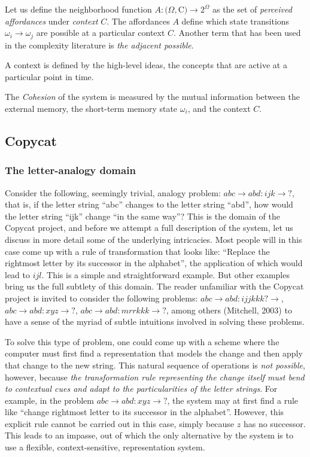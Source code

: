 Let us define the neighborhood function $A:(\Omega,$C$) \to 2^\Omega$ as the set of \emph{perceived affordances} under \emph{context} $C$.  The affordances $A$ define which state transitions $\omega_i \to \omega_j$ are possible at a particular context $C$. Another term that has been used in the complexity literature is \emph{the adjacent possible}. 

A context is defined by the high-level ideas, the concepts that are active at a particular point in time. 

The \emph{Cohesion} of the system is measured by the mutual information between the external memory, the short-term memory state $\omega_i$, and the context $C$.  

\subsection{Copycat}


\subsubsection{The letter-analogy domain}

Consider the following, seemingly trivial, analogy problem: $abc \to abd:ijk \to ?$, that is, if the letter string “abc” changes to the letter string “abd”, how would the letter string “ijk” change “in the same way”?  This is the domain of the Copycat project, and before we attempt a full description of the system, let us discuss in more detail some of the underlying intricacies.   Most people will in this case come up with a rule of transformation that looks like: “Replace the rightmost letter by its successor in the alphabet”, the application of which would lead to $ijl$.  This is a simple and straightforward example.  But other examples bring us the full subtlety of this domain.  The reader unfamiliar with the Copycat project is invited to consider the following problems: $abc\to abd: ijjkkk?\to $, $abc\to abd: xyz\to ?$, $abc\to abd: mrrkkk\to ?$, among others (Mitchell, 2003) to have a sense of the myriad of subtle intuitions involved in solving these problems.

To solve this type of problem, one could come up with a scheme where the computer must first find a representation that models the change and then apply that change to the new string.  This natural sequence of operations is \emph{not possible}, however, because \emph{the transformation rule representing the change itself must bend to contextual cues and adapt to the particularities of the letter strings}.  For example, in the problem $abc\to abd: xyz\to ?$, the system may at first find a rule like “change rightmost letter to its successor in the alphabet”.  However, this explicit rule cannot be carried out in this case, simply because $z$ has no successor.  This leads to an impasse, out of which the only alternative by the system is to use a flexible, context-sensitive, representation system. 

